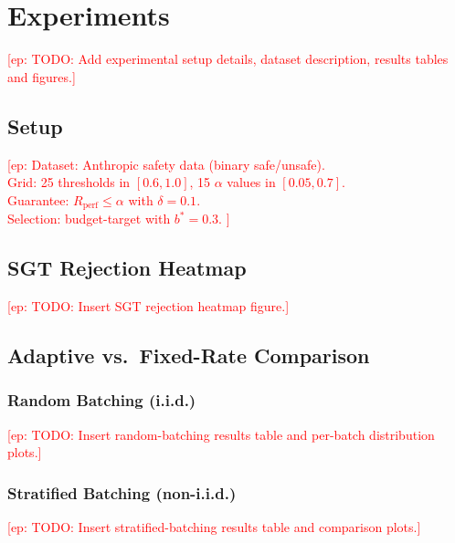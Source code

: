 \documentclass{article}
\newcommand{\edoardo}[1]{\textcolor{red}{[ep: #1]}}
\begin{document}
\section{Experiments}
\label{sec:experiments}

\edoardo{TODO: Add experimental setup details, dataset description, results tables and figures.}

\subsection{Setup}

\edoardo{
Dataset: Anthropic safety data (binary safe/unsafe). \\
Grid: 25 thresholds in $[0.6, 1.0]$, 15 $\alpha$ values in $[0.05, 0.7]$. \\
Guarantee: $R_{\text{perf}} \leq \alpha$ with $\delta = 0.1$. \\
Selection: budget-target with $b^* = 0.3$.
}


\subsection{SGT Rejection Heatmap}

\edoardo{TODO: Insert SGT rejection heatmap figure.}


\subsection{Adaptive vs.\ Fixed-Rate Comparison}

\subsubsection{Random Batching (i.i.d.)}

\edoardo{TODO: Insert random-batching results table and per-batch distribution plots.}


\subsubsection{Stratified Batching (non-i.i.d.)}

\edoardo{TODO: Insert stratified-batching results table and comparison plots.}
\end{document}
